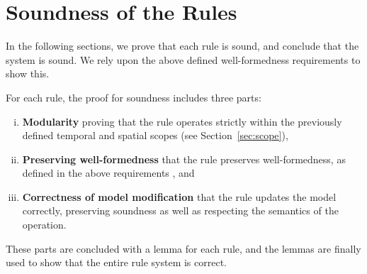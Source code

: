 \section{Soundness of the Rules}
\label{sec:soundness-of-the-rules}
In the following sections, we prove that each rule is sound, and conclude that the system is sound. We rely upon the above defined well-formedness requirements  to show this.

For each rule, the proof for soundness includes three parts:
\begin{enumerate}[(i)]
   \item \textbf{Modularity} \textemdash{} proving that the rule operates strictly within the previously defined temporal and spatial scopes (see Section~\ref{sec:scope}), 
   \item \textbf{Preserving well-formedness} \textemdash{} that the rule preserves well-formedness, as defined in the above requirements , and
   \item \textbf{Correctness of model modification} \textemdash{} that the rule updates the model correctly, preserving soundness as well as respecting the semantics of the operation.
\end{enumerate}

These parts are concluded with a lemma for each rule, and the lemmas are finally used to show that the entire rule system is correct.
